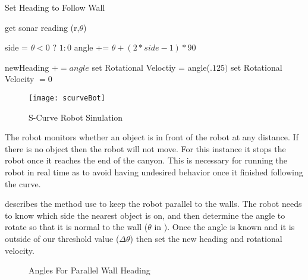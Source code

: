 \documentclass[main.tex]{subfiles}
\begin{document}
\begin{algorithm}
\caption{Set Heading to Follow Wall}
\label{al:folWall}
\begin{algorithmic}
\STATE get sonar reading (r,$\theta$)

\STATE side = $\theta < 0$ ? $1 : 0$
\STATE angle += $\theta + (2*side-1)*90$

	\STATE newHeading $+= angle$
	\STATE set Rotational Veloctiy = angle($.125)$
\ELSE 
	\STATE set Rotational Velocity $= 0$
\ENDIF

\end{algorithmic}
\end{algorithm}

\begin{figure}[H]
\begin{center}
\texttt{[image: scurveBot]}
\end{center}
\caption{S-Curve Robot Sinulation}
\label{fig:scurveSim}
\end{figure}


The robot monitors whether an object is in front of the robot at any distance.
If there is no object then the robot will not move. For this instance it stops
the robot once it reaches the end of the canyon. This is necessary for running
the robot in real time as to avoid having undesired behavior once it finished
following the curve. 

 describes the method use to keep the robot parallel to the
walls. The robot needs to know which side the nearest object is on, and then
determine the angle to rotate so that it is normal to the wall ($\theta$ in
). Once the angle is known and it is outside of our threshold
value ($\Delta\theta$) then set the new heading and rotational velocity.

\begin{figure}[H]
\begin{center}

\end{center}
\caption{Angles For Parallel Wall Heading}
\label{fig:prWall}
\end{figure}
\end{document}
